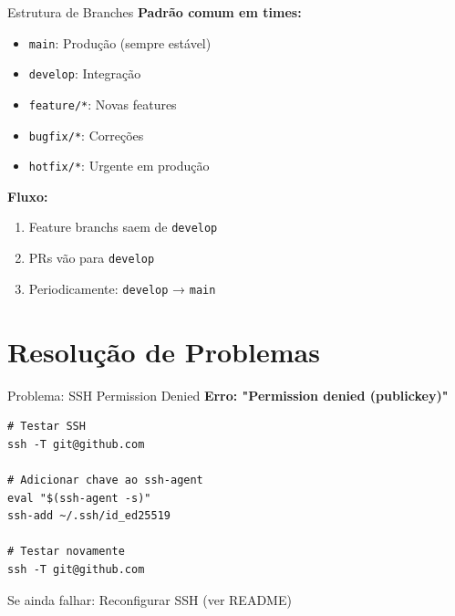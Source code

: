 \documentclass[11pt]{beamer}
\begin{document}
\begin{frame}{Estrutura de Branches}
\textbf{Padrão comum em times:}

\begin{itemize}
    \item \texttt{main}: Produção (sempre estável)
    \item \texttt{develop}: Integração
    \item \texttt{feature/*}: Novas features
    \item \texttt{bugfix/*}: Correções
    \item \texttt{hotfix/*}: Urgente em produção
\end{itemize}

\vspace{0.5cm}

\textbf{Fluxo:}
\begin{enumerate}
    \small
    \item Feature branchs saem de \texttt{develop}
    \item PRs vão para \texttt{develop}
    \item Periodicamente: \texttt{develop} → \texttt{main}
\end{enumerate}
\end{frame}

\section{Resolução de Problemas}

\begin{frame}{Problema: SSH Permission Denied}
\textbf{Erro: "Permission denied (publickey)"}

\begin{lstlisting}
# Testar SSH
ssh -T git@github.com

# Adicionar chave ao ssh-agent
eval "$(ssh-agent -s)"
ssh-add ~/.ssh/id_ed25519

# Testar novamente
ssh -T git@github.com
\end{lstlisting}

\vspace{0.3cm}

Se ainda falhar: Reconfigurar SSH (ver README)
\end{frame}
\end{document}
